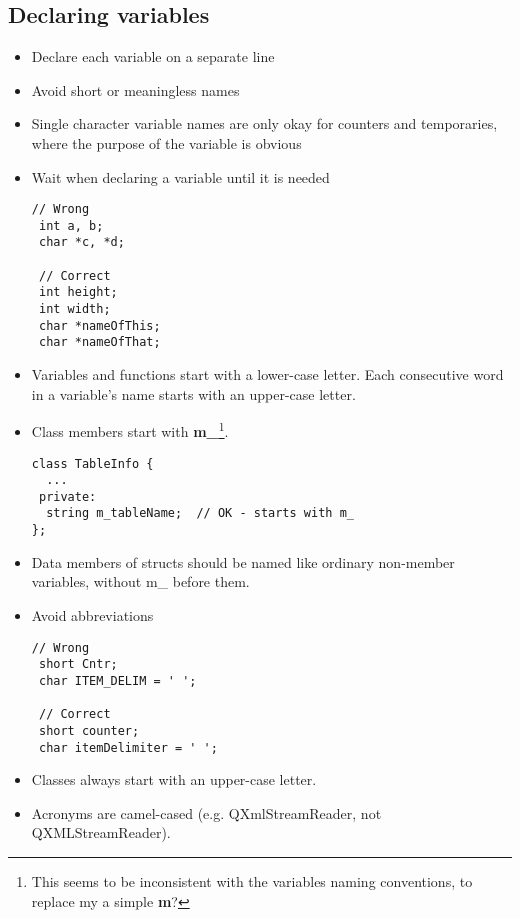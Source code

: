 \documentclass[a4paper,12pt]{article}
\begin{document}
\subsection{Declaring variables}

\begin{itemize}
\item  Declare each variable on a separate line
\item  Avoid short or meaningless names
\item  Single character variable names are only okay for counters and temporaries, where the purpose of the variable is obvious
\item  Wait when declaring a variable until it is needed
\begin{lstlisting}[breaklines]
// Wrong
 int a, b;
 char *c, *d;

 // Correct
 int height;
 int width;
 char *nameOfThis;
 char *nameOfThat;
 \end{lstlisting}
\item  Variables and functions start with a lower-case letter. Each consecutive word in a variable's name starts with an upper-case letter.
\item  Class members start with {\bf m\_}\footnote{This seems to be inconsistent with the variables naming conventions, to replace my a simple {\bf m}?}. 
\begin{lstlisting}[breaklines]
 class TableInfo {
  ...
 private:
  string m_tableName;  // OK - starts with m_
};
 \end{lstlisting}
\item  Data members of structs should be named like ordinary non-member variables, without {m\_} before them.
\item  Avoid abbreviations
\begin{lstlisting}[breaklines]
 // Wrong
 short Cntr;
 char ITEM_DELIM = ' ';

 // Correct
 short counter;
 char itemDelimiter = ' ';
 \end{lstlisting}
\item  Classes always start with an upper-case letter. 
\item  Acronyms are camel-cased (e.g. QXmlStreamReader, not QXMLStreamReader).
\end{itemize}

\end{document}
